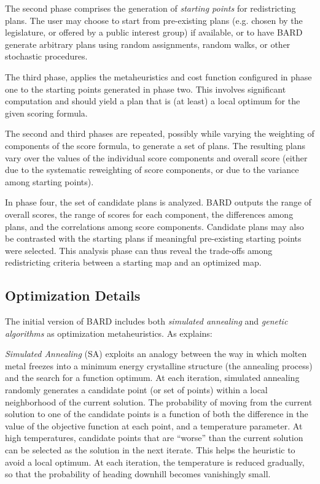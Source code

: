 \documentclass[article]{JSSstyle/jss}
\begin{document}
The second phase comprises the generation of \emph{starting points} for redistricting plans.
The user may choose to start from pre-existing plans (e.g. chosen by the legislature, or offered
by a public interest group) if available, or to have BARD generate arbitrary plans using 
random assignments, random walks, or other stochastic procedures.

The third phase, applies the metaheuristics and cost function configured in phase one to the 
starting points generated in phase two. This involves significant computation and should yield a plan that is
(at least) a local optimum for the given scoring formula. 

The second and third phases are repeated, possibly while varying the weighting of components of the score formula, 
to generate a set of plans. The resulting plans vary over the 
values of the individual score components and overall score (either due to the systematic 
reweighting of score components, or due to the variance among starting points).  

In phase four, the set of candidate plans is analyzed. BARD outputs the 
range of overall scores, the range of scores for each component, the differences 
among plans, and the correlations among score components.  Candidate plans 
may also be contrasted with the starting plans if meaningful pre-existing starting 
points were selected.  This analysis phase can thus reveal the trade-offs among
redistricting criteria between a starting map and an optimized map.

\subsection{Optimization Details}

The initial version of BARD includes both \emph{simulated annealing} and \emph{genetic algorithms} 
as optimization metaheuristics. As \citep[][chapter 4]{AltGilMcD03} explains:

\emph{Simulated Annealing} (SA) exploits an analogy between the
way in which molten metal freezes into a minimum energy
crystalline structure (the annealing process) and the search for a
function optimum.   At each iteration, simulated annealing randomly generates
a candidate point (or set of points) within a local neighborhood
of the current solution. The probability of moving from the
current solution to one of the candidate points is a function of both
the difference in the value of the objective function at each point, and a 
temperature parameter. At high temperatures, candidate points that are ``worse'' than 
the current solution can be selected as the solution in the next iterate.  This helps the 
heuristic to avoid a local optimum. At each iteration, the temperature is reduced gradually, so 
that the probability of heading downhill becomes vanishingly small.
\end{document}
